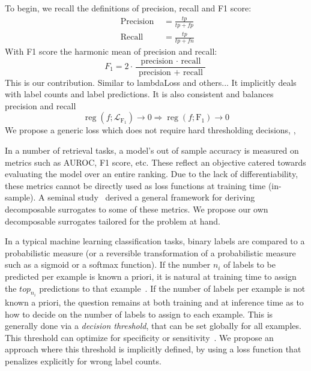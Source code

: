 To begin, we recall the definitions of precision, recall and F1 score:
%
\begin{equation}
	\begin{aligned} 
		\text { Precision } &=\frac{t p}{t p+f p} \\ 
		\text{ Recall } &=\frac{t p}{t p+f n} 
	\end{aligned}
\end{equation}
%
With F1 score the harmonic mean of precision and recall:
%
\begin{equation}
F_1=2 \cdot \frac{\text { precision } \cdot \text { recall }}{\text { precision }+\text { recall }}
\end{equation}
%
This is our contribution. Similar to lambdaLoss and others... It implicitly deals with label counts and label predictions. It is also consistent and balances precision and recall 
%
\begin{equation}
\operatorname{reg}\left(f ; \mathcal{L}_{\mathrm{F_1}}\right) \rightarrow 0 \Longrightarrow \operatorname{reg}\left(f ; \mathrm{F_1}\right) \rightarrow 0
\end{equation}
%
We propose a generic loss which does not require hard thresholding decisions, , 

In a number of retrieval tasks, a model's out of sample accuracy is measured
on metrics such as AUROC, F1 score, etc. These reflect an objective catered
towards evaluating the model over an entire ranking. Due to the lack of
differentiability, these metrics cannot be directly used as loss functions at
training time (in-sample). A seminal study~\cite{optimizableLosses} derived a
general framework for deriving decomposable surrogates to some of these
metrics. We propose our own decomposable surrogates tailored for the problem
at hand.

In a typical machine learning classification tasks, binary labels are compared to a probabilistic measure (or a reversible
transformation of a probabilistic measure such as a sigmoid or a softmax
function). If the number $n_i$ of labels to be predicted per
example is known a priori, it is natural at training time to assign the $top_{n_i}$ predictions
to that example~\cite{lossTopKError, topKmulticlassSVM}. If the number of
labels per example is not known a priori, the question remains at both training and at inference time
as to how to decide on the number of labels to assign to each
example. This is generally done via a \emph{decision threshold}, that can be set globally for all
examples. This threshold can optimize for specificity or
sensitivity~\cite{decisionThreshold}. We propose an approach where this threshold
is implicitly defined, by using a loss function that penalizes explicitly for wrong label counts.

